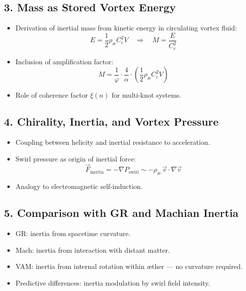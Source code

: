 \subsection*{3. Mass as Stored Vortex Energy}

\begin{itemize}
    \item Derivation of inertial mass from kinetic energy in circulating vortex fluid:
    \[
        E = \frac{1}{2} \rho_\text{\ae} C_e^2 V \quad \Rightarrow \quad M = \frac{E}{C_e^2}
    \]
    \item Inclusion of amplification factor:
    \[
        M = \frac{1}{\varphi} \cdot \frac{4}{\alpha} \cdot \left( \frac{1}{2} \rho_\text{\ae} C_e^2 V \right)
    \]
    \item Role of coherence factor $\xi(n)$ for multi-knot systems.
\end{itemize}

\subsection*{4. Chirality, Inertia, and Vortex Pressure}

\begin{itemize}
    \item Coupling between helicity and inertial resistance to acceleration.
    \item Swirl pressure as origin of inertial force:
    \[
        \vec{F}_\text{inertia} = -\nabla P_\text{swirl} \sim -\rho_\text{\ae} \, \vec{v} \cdot \nabla \vec{v}
    \]
    \item Analogy to electromagnetic self-induction.
\end{itemize}

\subsection*{5. Comparison with GR and Machian Inertia}

\begin{itemize}
    \item GR: inertia from spacetime curvature.
    \item Mach: inertia from interaction with distant matter.
    \item VAM: inertia from internal rotation within æther --- no curvature required.
    \item Predictive differences: inertia modulation by swirl field intensity.
\end{itemize}

